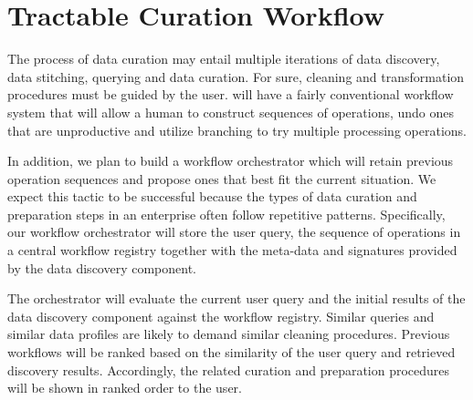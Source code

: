 \section{Tractable Curation Workflow}
\label{sec:workflow}

The process of data curation may entail multiple iterations of data discovery,
data stitching, querying and data curation. For sure, cleaning and
transformation procedures must be guided by the user. \dcv will have a fairly
conventional workflow system that will allow a human to construct sequences of
operations, undo ones that are unproductive and utilize branching to try
multiple processing operations.


In addition, we plan to build a workflow orchestrator which will retain previous
operation sequences and propose ones that best fit the current situation. We
expect this tactic to be successful because the types of data curation and
preparation steps in an enterprise often follow repetitive patterns.
Specifically, our workflow orchestrator will store the user query, the sequence
of operations in a central workflow registry together with the meta-data and
signatures provided by the data discovery component. 


The orchestrator will evaluate the current user query and the initial results of
the data discovery component against the workflow registry. Similar queries and
similar data profiles are likely to demand similar cleaning procedures. Previous
workflows will be ranked based on the similarity of the user query and retrieved
discovery results. Accordingly, the related curation and preparation procedures
will be shown in ranked order to the user.
